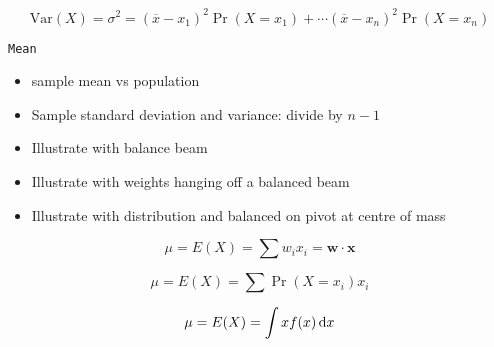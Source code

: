\begin{displaymath}
  \mbox{Var}(X) = \sigma^2 = (\overline x - x_1)^2 \Pr(X=x_1) + \dotsb
  (\overline x - x_n)^2 \Pr(X=x_n)
\end{displaymath}

\texttt{Mean}
\begin{itemize}
\item sample mean vs population
\item Sample standard deviation and variance: divide by $n-1$
\item Illustrate with balance beam
\item Illustrate with weights hanging off a balanced beam
\item Illustrate with distribution and balanced on pivot at centre of mass
\end{itemize}

\begin{displaymath}
  \mu = E(X) = \sum w_i x_i = \mathbf{w\cdot x}
\end{displaymath}

\begin{displaymath}
  \mu = E(X) = \sum \Pr(X=x_i) x_i  
\end{displaymath}

\begin{displaymath}
  \mu = E(X) = \int xf(x) \,\mathrm{d}{x}
\end{displaymath}



